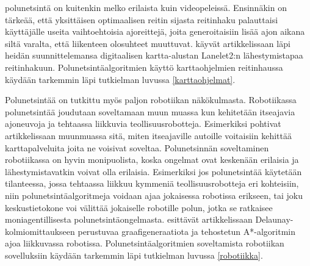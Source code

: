 polunetsintä on kuitenkin melko erilaista kuin videopeleissä. Ensinnäkin on 
tärkeää, että yksittäisen optimaalisen reitin sijasta reitinhaku palauttaisi 
käyttäjälle useita vaihtoehtoisia ajoreittejä, joita generoitaisiin lisää 
ajon aikana siltä varalta, että liikenteen olosuhteet 
muuttuvat.\cite{Lanelet2} \textcite{Lanelet2} käyvät artikkelissaan läpi 
heidän suunnittelemansa digitaalisen kartta-alustan Lanelet2:n 
lähestymistapaa reitinhakuun. Polunetsintäalgoritmien käyttö 
karttaohjelmien reitinhaussa käydään tarkemmin läpi tutkielman luvussa 
\ref{karttaohjelmat}. \par
	Polunetsintää on tutkittu myös paljon robotiikan näkökulmasta. 
Robotiikassa polunetsintää joudutaan soveltamaan muun muassa kun 
kehitetään itseajavia ajoneuvoja ja tehtaassa liikkuvia 
teollisuusrobotteja.\cite{arXivMAPF} Esimerkiksi \textcite{Lanelet2} 
pohtivat artikkelissaan muunmuassa sitä, miten itseajaville autoille 
voitaisiin kehittää karttapalveluita joita ne voisivat soveltaa. 
Polunetsinnän soveltaminen robotiikassa on hyvin monipuolista, koska 
ongelmat ovat keskenään erilaisia ja lähestymistavatkin voivat olla 
erilaisia. Esimerkiksi jos polunetsintää käytetään tilanteessa, jossa 
tehtaassa liikkuu kymmeniä teollisuusrobotteja eri kohteisiin, niin 
polunetsintäalgoritmeja voidaan ajaa jokaisessa robotissa erikseen, tai 
joku keskustietokone voi välittää jokaiselle robotille polun, jotka se 
ratkaisee moniagentillisesta polunetsintäongelmasta. 
\textcite{DelaunayVoronoiAStar} esittävät artikkelissaan 
Delaunay-kolmiomittaukseen perustuvaa graafigeneraatiota ja tehostetun 
A*-algoritmin ajoa liikkuvassa robotissa. Polunetsintäalgoritmien 
soveltamista robotiikan sovelluksiin käydään tarkemmin läpi tutkielman 
luvussa \ref{robotiikka}.

